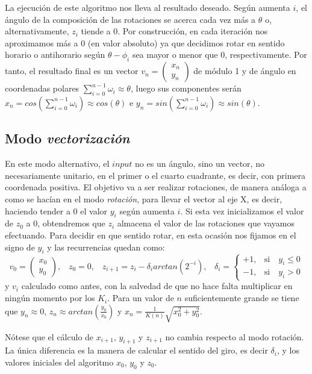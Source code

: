 \documentclass[12pt, a4paper]{article}
\begin{document}
 La ejecución de este algoritmo nos lleva al resultado deseado. Según aumenta $i$, el ángulo de la composición de las rotaciones se acerca cada vez más a $\theta$ o, alternativamente, $z_i$ tiende a 0. Por construcción, en cada iteración nos aproximamos más a 0 (en valor absoluto) ya que decidimos rotar en sentido horario o antihorario según $\theta-\phi_i$ sea mayor o menor que 0, respectivamente. Por tanto, el resultado final es un vector $v_n=\begin{pmatrix*}
  x_n\\
  y_n
 \end{pmatrix*}$ de módulo 1 y de ángulo en coordenadas polares $\sum_{i=0}^{n-1} \omega_i\approx \theta$, luego sus componentes serán $x_n=cos(\sum_{i=0}^{n-1} \omega_i)\approx cos(\theta)$ e $y_n=sin(\sum_{i=0}^{n-1} \omega_i)\approx sin(\theta)$.
 \subsection{Modo \textit{vectorización}}
 En este modo alternativo, el $input$ no es un ángulo, sino un vector, no necesariamente unitario, en el primer o el cuarto cuadrante, es decir, con primera coordenada positiva. El objetivo va a ser realizar rotaciones, de manera análoga a como se hacían en el modo \textit{rotación}, para llevar el vector al eje X, es decir, haciendo tender a 0 el valor $y_i$ según aumenta $i$. Si esta vez inicializamos el valor de $z_0$ a 0, obtendremos que $z_i$ almacena el valor de las rotaciones que vayamos efectuando. Para decidir en que sentido rotar, en esta ocasión nos fijamos en el signo de $y_i$ y las recurrencias quedan como:
 \[
 v_0=\begin{pmatrix*}
  x_0\\
  y_0
 \end{pmatrix*}, \;\;\;
 z_0=0,\;\;\;z_{i+1}=z_{i}-\delta_i arctan(2^{-i}),\;\;\;
 \delta_i=\begin{cases}
+1,&\mathrm{si}\quad y_{i}\leq0\\
-1,&\mathrm{si}\quad y_{i}>0
\end{cases}
 \]
 y $v_i$ calculado como antes, con la salvedad de que no hace falta multiplicar en ningún momento por los $K_i$.
 Para un valor de $n$ suficientemente grande se tiene que $y_n\approx0$, $z_n\approx arctan(\frac{y_0}{x_0})$ y $x_n = \frac{1}{K(n)}\sqrt{x_0^2+y_0^2}$.
 
 Nótese que el cálculo de $x_{i+1}$, $y_{i+1}$ y $z_{i+1}$ no cambia respecto al modo rotación. La única diferencia es la manera de calcular el sentido del giro, es decir $\delta_i$, y los valores iniciales del algoritmo $x_0$, $y_0$ y $z_0$.
\end{document}
